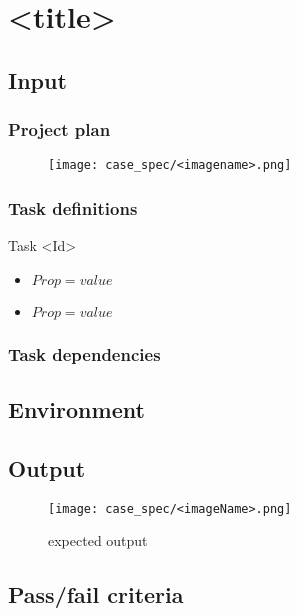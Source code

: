 \chapter{<title>}
\label{chap:<title>}

\section{Input}
\subsection{Project plan}
\begin{figure}[h!] 
\centering
\texttt{[image: case\_spec/<imagename>.png]}
\end{figure}

\subsection{Task definitions}
\begin{taksDef}{Task <Id>}
\begin{itemize}
  \item $Prop = value$
  \item $Prop = value$
\end{itemize}
\end{taksDef}

\subsection{Task dependencies}

\section{Environment}

\section{Output}
\begin{sidewaysfigure}[h!] 
\centering
\texttt{[image: case\_spec/<imageName>.png]}
\caption{expected output}
\end{sidewaysfigure}

\section{Pass/fail criteria}